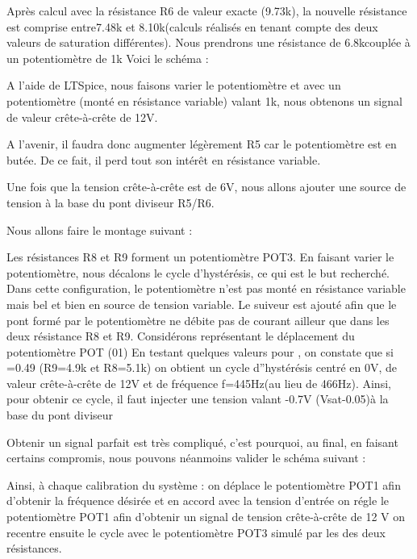Après calcul avec la résistance R6 de valeur exacte (9.73k), la nouvelle résistance est  comprise entre7.48k et 8.10k(calculs réalisés en tenant compte des deux valeurs de saturation différentes).
Nous prendrons une résistance de 6.8kcouplée à un potentiomètre de 1k
Voici le schéma :


A l’aide de LTSpice, nous faisons varier le potentiomètre et avec un potentiomètre (monté en résistance variable) valant 1k, nous obtenons un signal de valeur crête-à-crête de 12V.


A l’avenir, il faudra donc augmenter légèrement R5 car le potentiomètre est en butée. De ce fait, il perd tout son intérêt en résistance variable.

Une fois que la tension crête-à-crête est de 6V, nous allons ajouter une source de tension à la base du pont diviseur R5/R6.






Nous allons faire le montage suivant : 



Les résistances R8 et R9 forment un potentiomètre POT3. En faisant varier le potentiomètre, nous décalons le cycle d'hystérésis, ce qui est le but recherché.
Dans cette configuration, le potentiomètre n’est pas monté en résistance variable mais bel et bien en source de tension variable. Le suiveur est ajouté afin que le pont formé par le potentiomètre ne débite pas de courant ailleur que dans les deux résistance R8 et R9.
Considérons représentant le déplacement du potentiomètre POT (01)
En testant quelques valeurs pour , on constate que si =0.49 (R9=4.9k et R8=5.1k)
on obtient un cycle d”hystérésis centré en 0V, de valeur crête-à-crête de 12V et de fréquence f=445Hz(au lieu de 466Hz).
Ainsi, pour obtenir ce cycle, il faut injecter une tension valant -0.7V (Vsat-0.05)à la base du pont diviseur

Obtenir un signal parfait est très compliqué, c’est pourquoi, au final, en faisant certains compromis, nous pouvons néanmoins valider le schéma suivant :





Ainsi, à chaque calibration du système : 
on déplace le potentiomètre POT1 afin d’obtenir la fréquence désirée et en accord avec la tension d’entrée
on régle le potentiomètre POT1 afin d’obtenir un signal de tension crête-à-crête de 12 V
on recentre ensuite le cycle avec le potentiomètre POT3 simulé par les des deux résistances.
